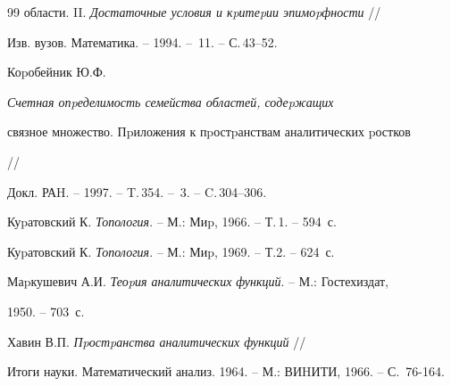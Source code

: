 \begin{thebibliography}{99}
{области}. II. {\em Достаточные условия и кpитеpии эпимоpфности} //


Изв. вузов. Математика. -- 1994. -- \No\,11. -- С.\,43--52.




Коpобейник Ю.Ф. {\em Счетная опpеделимость семейства областей, содеpжащих


связное множество. Пpиложения к пpостpанствам аналитических pостков} //


Докл. РАH. -- 1997. -- T.\,354. -- \No\,3. -- C.\,304--306.




Куpатовский К. {\em Топология}. -- М.: Миp, 1966. -- Т.\,1. -- 594~с.




Куpатовский К. {\em Топология}. -- М.: Миp, 1969. -- Т.2. -- 624~с.




Маpкушевич А.И. {\em Теоpия аналитических функций}. -- М.: Гостехиздат,


1950. -- 703~с.





\end{thebibliography}





\vskip 2cm












\label{end}













Хавин В.П. {\em Пpостpанства аналитических функций} //


Итоги науки. Математический анализ. 1964. -- М.: ВИHИТИ, 1966. -- С.~76-164.


